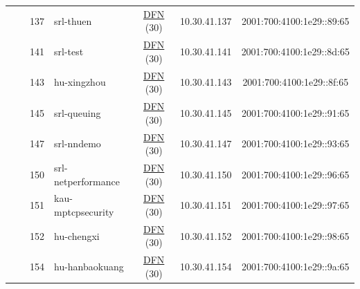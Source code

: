\begin{small}
\begin{center}
\begin{longtable}{|c|c|c|c|c|c|c|c|}
  &  & \tiny{137} & \multicolumn{1}{|l|}{\tiny{srl-thuen}} & \multicolumn{2}{|c|}{\tiny{\href{https://www.dfn.de}{DFN} (30)}} & \tiny{10.30.41.137} & \tiny{2001:700:4100:1e29::89:65} \\* \cline{3-3}\cline{4-4}\cline{5-5}\cline{6-6}\cline{7-7}\cline{8-8}
  &  & \tiny{141} & \multicolumn{1}{|l|}{\tiny{srl-test}} & \multicolumn{2}{|c|}{\tiny{\href{https://www.dfn.de}{DFN} (30)}} & \tiny{10.30.41.141} & \tiny{2001:700:4100:1e29::8d:65} \\* \cline{3-3}\cline{4-4}\cline{5-5}\cline{6-6}\cline{7-7}\cline{8-8}
  &  & \tiny{143} & \multicolumn{1}{|l|}{\tiny{hu-xingzhou}} & \multicolumn{2}{|c|}{\tiny{\href{https://www.dfn.de}{DFN} (30)}} & \tiny{10.30.41.143} & \tiny{2001:700:4100:1e29::8f:65} \\* \cline{3-3}\cline{4-4}\cline{5-5}\cline{6-6}\cline{7-7}\cline{8-8}
  &  & \tiny{145} & \multicolumn{1}{|l|}{\tiny{srl-queuing}} & \multicolumn{2}{|c|}{\tiny{\href{https://www.dfn.de}{DFN} (30)}} & \tiny{10.30.41.145} & \tiny{2001:700:4100:1e29::91:65} \\* \cline{3-3}\cline{4-4}\cline{5-5}\cline{6-6}\cline{7-7}\cline{8-8}
  &  & \tiny{147} & \multicolumn{1}{|l|}{\tiny{srl-nndemo}} & \multicolumn{2}{|c|}{\tiny{\href{https://www.dfn.de}{DFN} (30)}} & \tiny{10.30.41.147} & \tiny{2001:700:4100:1e29::93:65} \\* \cline{3-3}\cline{4-4}\cline{5-5}\cline{6-6}\cline{7-7}\cline{8-8}
  &  & \tiny{150} & \multicolumn{1}{|l|}{\tiny{srl-netperformance}} & \multicolumn{2}{|c|}{\tiny{\href{https://www.dfn.de}{DFN} (30)}} & \tiny{10.30.41.150} & \tiny{2001:700:4100:1e29::96:65} \\* \cline{3-3}\cline{4-4}\cline{5-5}\cline{6-6}\cline{7-7}\cline{8-8}
  &  & \tiny{151} & \multicolumn{1}{|l|}{\tiny{kau-mptcpsecurity}} & \multicolumn{2}{|c|}{\tiny{\href{https://www.dfn.de}{DFN} (30)}} & \tiny{10.30.41.151} & \tiny{2001:700:4100:1e29::97:65} \\* \cline{3-3}\cline{4-4}\cline{5-5}\cline{6-6}\cline{7-7}\cline{8-8}
  &  & \tiny{152} & \multicolumn{1}{|l|}{\tiny{hu-chengxi}} & \multicolumn{2}{|c|}{\tiny{\href{https://www.dfn.de}{DFN} (30)}} & \tiny{10.30.41.152} & \tiny{2001:700:4100:1e29::98:65} \\* \cline{3-3}\cline{4-4}\cline{5-5}\cline{6-6}\cline{7-7}\cline{8-8}
  &  & \tiny{154} & \multicolumn{1}{|l|}{\tiny{hu-hanbaokuang}} & \multicolumn{2}{|c|}{\tiny{\href{https://www.dfn.de}{DFN} (30)}} & \tiny{10.30.41.154} & \tiny{2001:700:4100:1e29::9a:65} \\* \cline{3-3}\cline{4-4}\cline{5-5}\cline{6-6}\cline{7-7}\cline{8-8}

\end{longtable}
\end{center}
\end{small}
